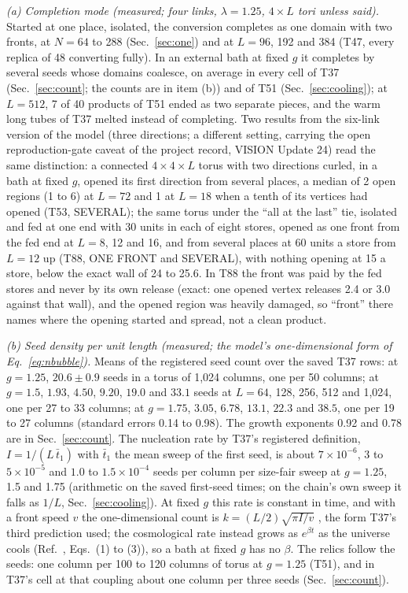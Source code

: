 \documentclass[aps,pre,10pt,twocolumn,superscriptaddress,nofootinbib]{revtex4-2}
\begin{document}
\emph{(a) Completion mode (measured; four links, $\lambda = 1.25$, $4 \times L$ tori unless said).} Started at one
place, isolated, the conversion completes as one domain with two fronts, at $N = 64$ to 288 (Sec.~\ref{sec:one}) and
at $L = 96$, 192 and 384 (T47, every replica of 48 converting fully). In an external bath at fixed $g$ it completes
by several seeds whose domains coalesce, on average in every cell of T37 (Sec.~\ref{sec:count}; the counts are in
item (b)) and of T51 (Sec.~\ref{sec:cooling}); at $L = 512$, 7 of 40 products of T51 ended as two separate pieces, and the warm long tubes
of T37 melted instead of completing. Two results from the six-link version of the model (three directions; a
different setting, carrying the open reproduction-gate caveat of the project record, VISION Update 24) read the
same distinction: a connected $4 \times 4 \times L$ torus with two directions curled, in a bath at fixed $g$, opened
its first direction from several places, a median of 2 open regions (1 to 6) at $L = 72$ and 1 at $L = 18$ when a
tenth of its vertices had opened (T53, SEVERAL); the same torus under the ``all at the last'' tie, isolated and
fed at one end with 30 units in each of eight stores, opened as one front from the fed end at $L = 8$, 12 and 16,
and from several places at 60 units a store from $L = 12$ up (T88, ONE FRONT and SEVERAL), with nothing opening at 15
a store, below the exact wall of 24 to 25.6. In T88 the front was paid by the fed stores and never by its own release
(exact: one opened vertex releases 2.4 or 3.0 against that wall), and the opened region was heavily damaged, so
``front'' there names where the opening started and spread, not a clean product.

\emph{(b) Seed density per unit length (measured; the model's one-dimensional form of Eq.~\eqref{eq:nbubble}).}
Means of the registered seed count over the saved T37 rows: at $g = 1.25$, $20.6 \pm 0.9$ seeds in a torus of 1,024
columns, one per 50 columns; at $g = 1.5$, $1.93$, $4.50$, $9.20$, $19.0$ and $33.1$ seeds at $L = 64$, 128, 256,
512 and 1,024, one per 27 to 33 columns; at $g = 1.75$, $3.05$, $6.78$, $13.1$, $22.3$ and $38.5$, one per 19 to 27
columns (standard errors 0.14 to 0.98). The growth exponents 0.92 and 0.78 are in Sec.~\ref{sec:count}. The
nucleation rate by T37's registered definition, $I = 1/(L\,\bar t_1)$ with $\bar t_1$ the mean sweep of the first
seed, is about $7 \times 10^{-6}$, $3$ to $5 \times 10^{-5}$ and $1.0$ to $1.5 \times 10^{-4}$ seeds per column per
size-fair sweep at $g = 1.25$, 1.5 and 1.75 (arithmetic on the saved first-seed times; on the chain's own sweep
it falls as $1/L$, Sec.~\ref{sec:cooling}). At fixed $g$ this rate is constant in time, and with a front speed $v$ the
one-dimensional count is $k = (L/2)\sqrt{\pi I / v}$ \cite{KJMA}, the form T37's third prediction used; the
cosmological rate instead grows as $e^{\beta t}$ as the universe cools (Ref.~\cite{CapriniEtAl16}, Eqs.~(1) to
(3)), so a bath at fixed $g$ has no $\beta$. The relics follow the seeds: one column per 100 to 120 columns of torus
at $g = 1.25$ (T51), and in T37's cell at that coupling about one column per three seeds (Sec.~\ref{sec:count}).
\end{document}
